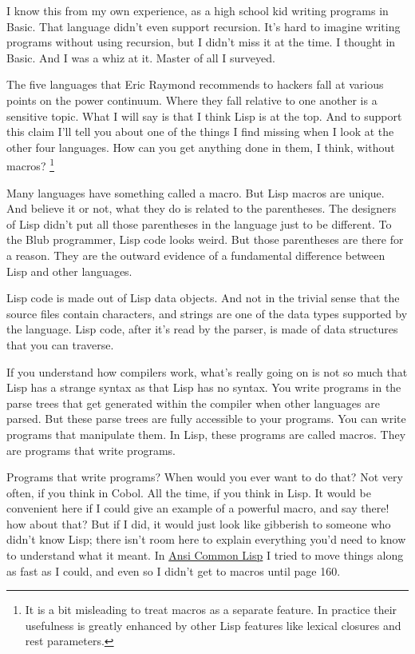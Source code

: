 \documentclass[12pt]{book}
\begin{document}
I know this from my own experience, as a high school kid writing
programs in Basic. That language didn't even support recursion. It's
hard to imagine writing programs without using recursion, but I didn't
miss it at the time. I thought in Basic. And I was a whiz at it. Master
of all I surveyed.

The five languages that Eric Raymond recommends to hackers fall at
various points on the power continuum. Where they fall relative to one
another is a sensitive topic. What I will say is that I think Lisp is at
the top. And to support this claim I'll tell you about one of the things
I find missing when I look at the other four languages. How can you get
anything done in them, I think, without macros? \footnote{It is a bit misleading to treat macros as a separate feature. In
practice their usefulness is greatly enhanced by other Lisp features
like lexical closures and rest parameters.}

Many languages have something called a macro. But Lisp macros are
unique. And believe it or not, what they do is related to the
parentheses. The designers of Lisp didn't put all those parentheses in
the language just to be different. To the Blub programmer, Lisp code
looks weird. But those parentheses are there for a reason. They are the
outward evidence of a fundamental difference between Lisp and other
languages.

Lisp code is made out of Lisp data objects. And not in the trivial sense
that the source files contain characters, and strings are one of the
data types supported by the language. Lisp code, after it's read by the
parser, is made of data structures that you can traverse.

If you understand how compilers work, what's really going on is not so
much that Lisp has a strange syntax as that Lisp has no syntax. You
write programs in the parse trees that get generated within the compiler
when other languages are parsed. But these parse trees are fully
accessible to your programs. You can write programs that manipulate
them. In Lisp, these programs are called macros. They are programs that
write programs.

Programs that write programs? When would you ever want to do that? Not
very often, if you think in Cobol. All the time, if you think in Lisp.
It would be convenient here if I could give an example of a powerful
macro, and say there! how about that? But if I did, it would just look
like gibberish to someone who didn't know Lisp; there isn't room here to
explain everything you'd need to know to understand what it meant. In
\href{acl.html}{Ansi Common Lisp} I tried to move things along as fast
as I could, and even so I didn't get to macros until page 160.
\end{document}

